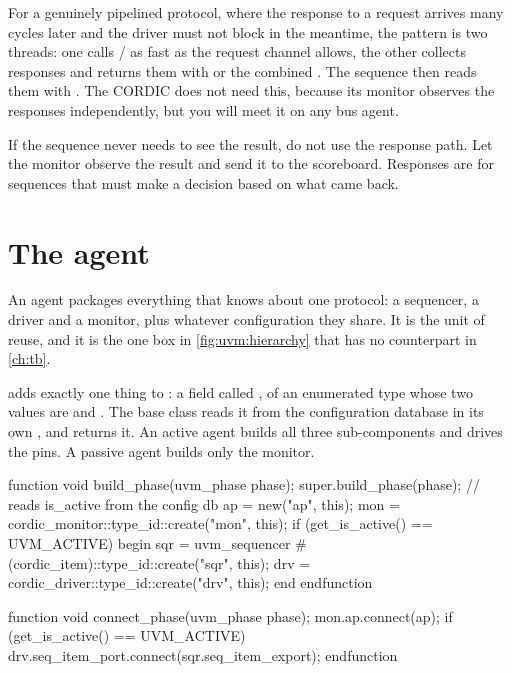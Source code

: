 For a genuinely pipelined protocol, where the response to a request arrives
many cycles later and the driver must not block in the meantime, the pattern
is two threads: one calls / as fast
as the request channel allows, the other collects responses and returns them
with  or the combined
. The sequence then reads them with
. The CORDIC does not need this, because its monitor
observes the responses independently, but you will meet it on any bus
agent.

\begin{ruleofthumb}
If the sequence never needs to see the result, do not use the response path.
Let the monitor observe the result and send it to the scoreboard. Responses
are for sequences that must make a decision based on what came back.
\end{ruleofthumb}

\section{The agent}
\label{sec:uvm:agent}

%
An agent packages everything that knows about one protocol: a sequencer, a
driver and a monitor, plus whatever configuration they share. It is the unit
of reuse, and it is the one box in \cref{fig:uvm:hierarchy} that has no
counterpart in \cref{ch:tb}.

 adds exactly one thing to : a field
called , of an enumerated type whose two values are
 and . The base class reads it from
the configuration database in its own , and
 returns it. An active agent builds all three sub-components and
drives the pins. A passive agent builds only the monitor.

\begin{uvmcode}[caption={The active/passive switch},label={lst:uvm:agent-active}]
function void build_phase(uvm_phase phase);
  super.build_phase(phase);          // reads is_active from the config db
  ap  = new("ap", this);
  mon = cordic_monitor::type_id::create("mon", this);
  if (get_is_active() == UVM_ACTIVE) begin
    sqr = uvm_sequencer #(cordic_item)::type_id::create("sqr", this);
    drv = cordic_driver::type_id::create("drv", this);
  end
endfunction

function void connect_phase(uvm_phase phase);
  mon.ap.connect(ap);
  if (get_is_active() == UVM_ACTIVE)
    drv.seq_item_port.connect(sqr.seq_item_export);
endfunction
\end{uvmcode}

